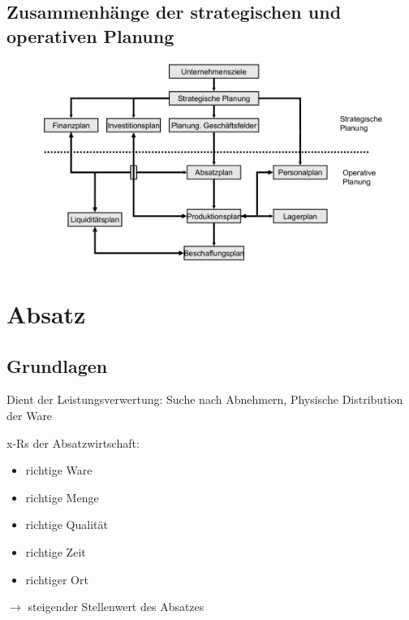 \documentclass[a4paper,11pt, twoside]{article}
\begin{document}
\subsection{Zusammenhänge der strategischen und operativen Planung}
\begin{figure}[h]
 \begin{center}
   \includegraphics[scale=0.3]{bilder/zusammenhang_strop.png}
 \end{center}
\end{figure}



\newpage
\section{Absatz}

\subsection{Grundlagen}
Dient der Leistungsverwertung: Suche nach Abnehmern, Physische Distribution der Ware

x-Rs der Absatzwirtschaft:
\begin{itemize}
	\item richtige Ware
	\item richtige Menge
	\item richtige Qualität
	\item richtige Zeit
	\item richtiger Ort
\end{itemize}
$\rightarrow$ steigender Stellenwert des Absatzes
\end{document}
